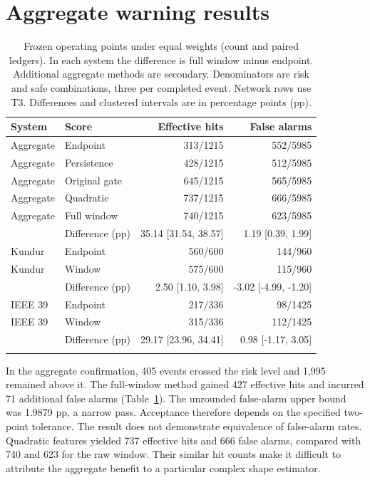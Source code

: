 \documentclass[10pt]{article}
\begin{document}
\section{Aggregate warning results}
\begin{table}[ht]\centering\small\caption{Frozen operating points under equal weights (count and paired ledgers). In each system the difference is full window minus endpoint. Additional aggregate methods are secondary. Denominators are risk and safe combinations, three per completed event. Network rows use T3. Differences and clustered intervals are in percentage points (pp).}\label{tab:primary}
\begin{tabular}{llrr}\toprule System & Score & Effective hits & False alarms\\\midrule
Aggregate & Endpoint & 313/1215 & 552/5985 \\
Aggregate & Persistence & 428/1215 & 512/5985 \\
Aggregate & Original gate & 645/1215 & 565/5985 \\
Aggregate & Quadratic & 737/1215 & 666/5985 \\
Aggregate & Full window & 740/1215 & 623/5985 \\
 & Difference (pp) & 35.14 [31.54, 38.57] & 1.19 [0.39, 1.99] \\\addlinespace
Kundur & Endpoint & 560/600 & 144/960 \\
Kundur & Window & 575/600 & 115/960 \\
 & Difference (pp) & 2.50 [1.10, 3.98] & -3.02 [-4.99, -1.20] \\\addlinespace
IEEE 39 & Endpoint & 217/336 & 98/1425 \\
IEEE 39 & Window & 315/336 & 112/1425 \\
 & Difference (pp) & 29.17 [23.96, 34.41] & 0.98 [-1.17, 3.05] \\\addlinespace
\bottomrule\end{tabular}
\end{table}
In the aggregate confirmation, 405 events crossed the risk level and 1,995 remained above it. The full-window method gained 427 effective hits and incurred 71 additional false alarms (Table~\ref{tab:primary}). The unrounded false-alarm upper bound was 1.9879 pp, a narrow pass. Acceptance therefore depends on the specified two-point tolerance. The result does not demonstrate equivalence of false-alarm rates. Quadratic features yielded 737 effective hits and 666 false alarms, compared with 740 and 623 for the raw window. Their similar hit counts make it difficult to attribute the aggregate benefit to a particular complex shape estimator.
\end{document}
